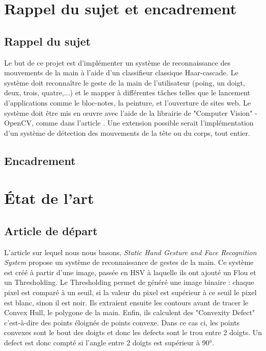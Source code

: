 \documentclass[11pt]{article}
\begin{document}
\newpage

\section{Rappel du sujet et encadrement}
\subsection{Rappel du sujet}

Le but de ce projet est d’implémenter un système de reconnaissance des mouvements de la
main à l’aide d’un classifieur classique Haar-cascade. Le système doit reconnaître le geste de
la main de l’utilisateur (poing, un doigt, deux, trois, quatre,...) et le mapper à différentes tâches
telles que le lancement d’applications comme le bloc-notes, la peinture, et l’ouverture de sites web.
Le système doit être mis en œuvre avec l’aide de la librairie de "Computer Vision" - OpenCV,
comme dans l’article \cite{joshi_static_2021}. Une extension possible serait l’implémentation d’un système de détection
des mouvements de la tête ou du corps, tout entier.

\subsection{Encadrement}

\newpage

\section{\'Etat de l'art}
\subsection{Article de départ}
L'article sur lequel nous nous basons, \textit{Static Hand Gesture and Face Recognition System} \cite{joshi_static_2021} propose un système de reconnaissance de gestes de la main. Ce système est créé à partir d'une image, passée en HSV à laquelle ils ont ajouté un Flou et un Thresholding. Le Thresholding permet de généré une image binaire :  chaque pixel est comparé à un seuil, si la valeur du pixel est supérieur à ce seuil le pixel est blanc, sinon il est noir. Ils extraient ensuite les contours avant de tracer le Convex Hull, le polygone de la main. Enfin, ils calculent des "Convexity Defect" c'est-à-dire des points éloignés de points convexe. Dans ce cas ci, les points convexes sont le bout des doigts et donc les defects sont le trou entre 2 doigts. Un defect est donc compté si l'angle entre 2 doigts est supérieur à 90°. 
\end{document}
